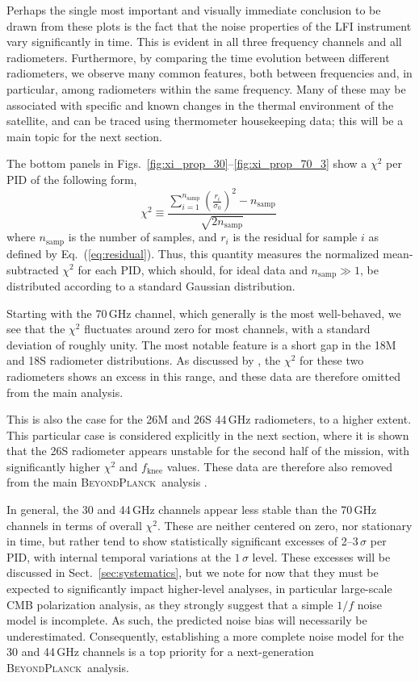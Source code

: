 \documentclass[twocolumn]{aa}
\newcommand{\BP}{\textsc{BeyondPlanck}}
\begin{document}
Perhaps the single most important and visually immediate conclusion to be drawn
from these plots is the fact that the noise properties of the LFI
instrument vary significantly in time. This is evident in all three
frequency channels and all radiometers. Furthermore, by comparing the
time evolution between different radiometers, we observe many common
features, both between frequencies and, in particular, among
radiometers within the same frequency. Many of these may be associated
with specific and known changes in the thermal environment of the
satellite, and can be traced using thermometer housekeeping data; this will
be a main topic for the next section.

The bottom panels in
Figs.~\ref{fig:xi_prop_30}--\ref{fig:xi_prop_70_3} show a $\chi^2$ per
PID of the following form,
\begin{equation}
  \chi^2 \equiv
  \frac{\sum_{i=1}^{n_\mathrm{samp}}\left(\frac{r_i}{\sigma_0}\right)^2 -
    n_\mathrm{samp}}{\sqrt{2n_\mathrm{samp}}}\
  \label{eq:chisq}
\end{equation}
where $n_\mathrm{samp}$ is the number of samples, and $r_i$ is the
residual for sample $i$ as defined by Eq.~(\ref{eq:residual}). Thus,
this quantity measures the normalized mean-subtracted $\chi^2$ for
each PID, which should, for ideal data and $n_\mathrm{samp}\gg1$, be
distributed according to a standard Gaussian distribution. 

Starting with the 70\,GHz channel, which generally is the most
well-behaved, we see that the $\chi^2$ fluctuates around zero for most
channels, with a standard deviation of roughly unity. The most notable
feature is a short gap in the 18M and 18S radiometer distributions. As
discussed by \citet{bp13}, the $\chi^2$ for these two radiometers
shows an excess in this range, and these data are therefore omitted
from the main analysis.

This is also the case for the 26M and 26S 44\,GHz radiometers, to a
higher extent. This particular case is considered explicitly in
the next section, where it is shown that the 26S radiometer appears
unstable for the second half of the mission, with significantly higher
$\chi^2$ and $f_{\mathrm{knee}}$ values. These data are therefore also
removed from the main \BP\ analysis \citep{bp13}. 

In general, the 30 and 44\,GHz channels appear less stable than
the 70\,GHz channels in terms of overall $\chi^2$. These are neither
centered on zero, nor stationary in time, but rather tend to show
statistically significant excesses of 2--$3\,\sigma$ per PID, with
internal temporal variations at the $1\,\sigma$ level. These excesses
will be discussed in Sect.~\ref{sec:systematics}, but we note
for now that they must be expected to significantly
impact higher-level analyses, in particular large-scale CMB
polarization analysis, as they strongly suggest that a simple $1/f$
noise model is incomplete. As such, the predicted noise bias will
necessarily be underestimated. Consequently, establishing a more complete noise
model for the 30 and 44\,GHz channels is a top priority
for a next-generation \BP\ analysis. 
\end{document}
